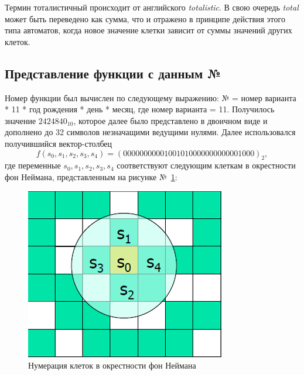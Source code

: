 \documentclass[a4paper, final]{article}
\begin{document}
Термин тоталистичный происходит от английского \textit{totalistic}. В свою очередь 
\textit{total} может быть переведено как сумма, что и отражено в принципе действия этого 
типа автоматов, когда новое значение клетки зависит от суммы значений других клеток.

\subsection{Представление функции с данным №}
Номер функции был вычислен по следующему выражению: № = номер варианта * 11 * год рождения * день * месяц,
где номер варианта = 11. Получилось значение $2424840_{10}$, которое далее было представлено в двоичном
виде и дополнено до 32 символов незначащими ведущими нулями. Далее использовался  получившийся 
вектор-столбец 
$$f(s_0, s_1, s_2, s_3, s_4) = (00000000001001010000000000001000)_2,$$
\noindent где переменные $s_0, s_1, s_2, s_3, s_4$ соответствуют следующим клеткам в окрестности 
фон Неймана, представленным на рисунке №~\ref{img:neyman_vars}:
\begin{figure}[H]
   \centering
   \includegraphics[scale=1]{neyman_vars.png}
   \caption{Нумерация клеток в окрестности фон Неймана}
   \label{img:neyman_vars}
\end{figure}

\newpage
\end{document}

